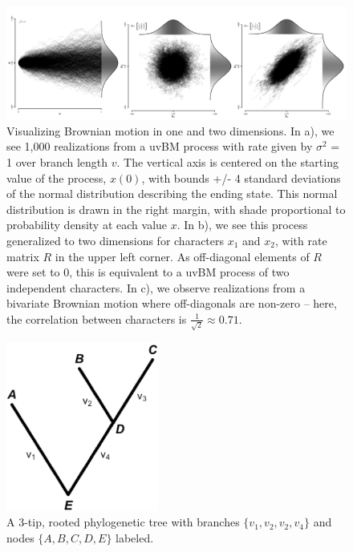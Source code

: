 \begin{figure}[h]
\centering
\includegraphics[width=160mm]{figures/unibivariateBMseed24.png}
\caption[Visualizing Brownian Motion in One and Two Dimensions]{Visualizing Brownian motion in one and two dimensions. In a), we see 1,000 realizations from a uvBM process with rate given by $\sigma^2$ = 1 over branch length $v$. The vertical axis is centered on the starting value of the process, $x(0)$, with bounds +/- 4 standard deviations of the normal distribution describing the ending state. This normal distribution is drawn in the right margin, with shade proportional to probability density at each value $x$. In b), we see this process generalized to two dimensions for characters $x_1$ and $x_2$, with rate matrix $R$ in the upper left corner. As off-diagonal elements of $R$ were set to 0, this is equivalent to a uvBM process of two independent characters. In c), we observe realizations from a bivariate Brownian motion where off-diagonals are non-zero -- here, the correlation between characters is $\frac{1}{\sqrt{2}} \approx 0.71$. 
\label{overflow}
\label{fig:univBM}
}
\end{figure}

\begin{figure}[t]
\centering
\includegraphics[width=50mm]{figures/simple3tiptree.png}
\caption[A Simple Rooted Tree with Three Tips]{A 3-tip, rooted phylogenetic tree with branches $\{v_1, v_2, v_2, v_4\}$ and nodes $\{A, B, C, D, E\}$ labeled. 
\label{overflow}
\label{fig:simpleTree}
}
\end{figure}

